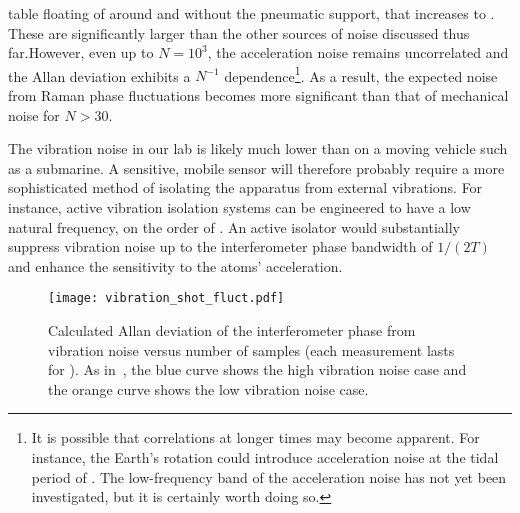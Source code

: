 table floating of around  and without the
pneumatic support, that increases to
. These are significantly larger than the other sources of noise discussed thus
far.However, even up to $N = 10^3$, the acceleration noise remains uncorrelated and
the Allan deviation exhibits a $N^{-1}$
dependence\footnote{It is possible that correlations at longer times may
become apparent. For instance, the Earth's rotation could introduce
acceleration noise at the tidal period of . The
low-frequency band of the acceleration noise has not yet been investigated, but it is certainly worth
doing so.}. As a result, the expected noise from Raman phase
fluctuations becomes more significant than that of mechanical noise
for $N > 30$.  
\par\noindent
The vibration noise in our lab is likely much lower than on a
moving vehicle such as a submarine. 
A sensitive, mobile sensor will therefore probably require a more sophisticated
method of isolating the apparatus from external vibrations. For
instance, active
vibration isolation systems can be engineered to have a low natural
frequency, on the order of
\cite{Zhou2012}. An active isolator would
substantially suppress vibration noise up to the interferometer phase
bandwidth of $1/(2T)$ and enhance the sensitivity to the atoms'
acceleration.
\begin{figure}[htpb]
  \centering
  \texttt{[image: vibration\_shot\_fluct.pdf]}
  \caption[Calculated Allan deviation of the interferometer phase from vibration
  noise.]{Calculated
    Allan deviation of the interferometer phase from vibration noise
    versus number of samples (each measurement lasts for
    ). As in~, the blue curve
shows the high vibration noise case and the orange curve shows the low
vibration noise case.}
  \label{fig:vibration_shot_fluct}
\end{figure}

